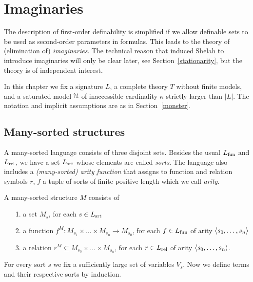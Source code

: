 \chapter{Imaginaries}
\label{imaginary}

\def\medrel#1{\parbox[t]{6ex}{$\displaystyle\hfil #1$}}
\def\ceq#1#2#3{\parbox[t]{25ex}{$\displaystyle #1$}\medrel{#2}{$\displaystyle #3$}}


\def\vl{\mr}

The description of first-order definability is simplified if we allow definable sets to be used as second-order parameters in formulas.
This leads to the theory of (elimination of) \textit{imaginaries}.
The technical reason that induced Shelah to introduce imaginaries will only be clear later, see Section~\ref{stationarity}, but the theory is of independent interest.

In this chapter we fix a signature $L$, a complete theory $T$ without finite models, and a saturated model $\EuScript U$ of inaccessible cardinality $\kappa$ strictly larger than $|L|$.
The notation and implicit assumptions are as in Section~\ref{monster}.

\section{Many-sorted structures}
\label{many-sorted}
\def\Ar{{\rm Ar}}

A many-sorted language consists of three disjoint sets.
Besides the usual $L_{\rm fun}$ and $L_{\rm rel}$, we have a set $L_{\rm srt}$  whose elements are called \emph{sorts}.
The language also includes a \emph{(many-sorted) arity function} that assigns to function and relation symbols $r$, $f$ a tuple of sorts of finite positive length which we call \emph{arity}.

A many-sorted structure $M$ consists of
\begin{itemize}
\item[1.] a set $M_s$, for each $s\in L_{\rm srt}$
\item[2.] a function $f^M:M_{s_1}\times\dots\times M_{s_n}\to M_{s_0}$, for each $f\in L_{\rm fun}$ of arity $\langle s_0,\dots,s_n\rangle$
\item[3.] a relation $r^M\subseteq M_{s_0}\times\dots\times M_{s_n}$, for each $r\in L_{\rm rel}$ of arity $\langle s_0,\dots,s_n\rangle$.
\end{itemize}

For every sort $s$ we fix a sufficiently large set of variables $V_s$.
Now we define terms and their respective sorts by induction.

